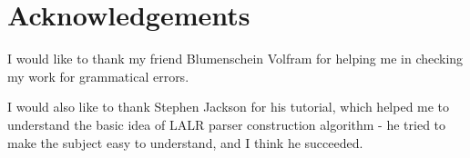\chapter*{Acknowledgements}

I would like to thank my friend Blumenschein Volfram for helping me in checking my work for grammatical errors. 

I would also like to thank Stephen Jackson for his tutorial, which helped me to understand the basic idea of LALR parser construction algorithm - he tried to make the subject easy to understand, and I think he succeeded.